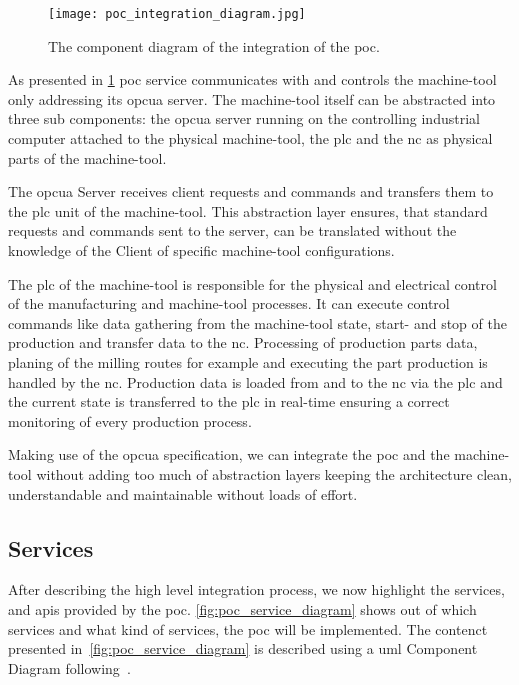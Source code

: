 \documentclass[
a4paper,
twoside,
headsepline,
cleardoublepage=empty,
parskip=half,
draft=false
]{scrbook}
\begin{document}
				\begin{figure}[htbp]
					\centering
					\texttt{[image: poc\_integration\_diagram.jpg]}
					\caption{The component diagram of the integration of the \gls{poc}.}
					\label{fig:poc_integration_diagram}
				\end{figure}

				As presented in \cref{fig:poc_integration_diagram} \gls{poc} service communicates with and controls the machine-tool only addressing its \gls{opcua} server. The machine-tool itself can be abstracted into three sub components: the \gls{opcua} server running on the controlling industrial computer attached to the physical machine-tool, the \gls{plc} and the \gls{nc} as physical parts of the machine-tool.

				The \gls{opcua} Server receives client requests and commands and transfers them to the \gls{plc} unit of the machine-tool. This abstraction layer ensures, that standard requests and commands sent to the server, can be translated without the knowledge of the Client of specific machine-tool configurations.

				The \gls{plc} of the machine-tool is responsible for the physical and electrical control of the manufacturing and machine-tool processes. It can execute control commands like data gathering from the machine-tool state, start- and stop of the production and transfer data to the \gls{nc}. Processing of production parts data, planing of the milling routes for example and executing the part production is handled by the \gls{nc}. Production data is loaded from and to the \gls{nc} via the \gls{plc} and the current state is transferred to the \gls{plc} in real-time ensuring a correct monitoring of every production process.

				Making use of the \gls{opcua} specification, we can integrate the \gls{poc} and the machine-tool without adding too much of abstraction layers keeping the architecture clean, understandable and maintainable without loads of effort.

			\subsection{Services} \label{subsec:services}

				After describing the high level integration process, we now highlight the services, and \gls{api}s provided by the \gls{poc}. \cref{fig:poc_service_diagram} shows out of which services and what kind of services, the \gls{poc} will be implemented. The contenct presented in~\cref{fig:poc_service_diagram} is described using a \gls{uml} Component Diagram following~\cite{uml2017}.
				
\end{document}
